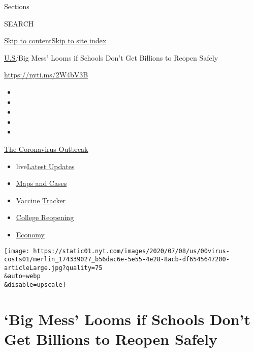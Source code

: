 Sections

SEARCH

\protect\hyperlink{site-content}{Skip to
content}\protect\hyperlink{site-index}{Skip to site index}

\href{/section/us}{U.S.}\textbar{}`Big Mess' Looms if Schools Don't Get
Billions to Reopen Safely

\url{https://nyti.ms/2W4bV3B}

\begin{itemize}
\item
\item
\item
\item
\item
\end{itemize}

\href{https://www.nytimes.com/news-event/coronavirus?action=click\&pgtype=Article\&state=default\&region=TOP_BANNER\&context=storylines_menu}{The
Coronavirus Outbreak}

\begin{itemize}
\tightlist
\item
  live\href{https://www.nytimes.com/2020/08/04/world/coronavirus-cases.html?action=click\&pgtype=Article\&state=default\&region=TOP_BANNER\&context=storylines_menu}{Latest
  Updates}
\item
  \href{https://www.nytimes.com/interactive/2020/us/coronavirus-us-cases.html?action=click\&pgtype=Article\&state=default\&region=TOP_BANNER\&context=storylines_menu}{Maps
  and Cases}
\item
  \href{https://www.nytimes.com/interactive/2020/science/coronavirus-vaccine-tracker.html?action=click\&pgtype=Article\&state=default\&region=TOP_BANNER\&context=storylines_menu}{Vaccine
  Tracker}
\item
  \href{https://www.nytimes.com/2020/08/02/us/covid-college-reopening.html?action=click\&pgtype=Article\&state=default\&region=TOP_BANNER\&context=storylines_menu}{College
  Reopening}
\item
  \href{https://www.nytimes.com/live/2020/08/04/business/stock-market-today-coronavirus?action=click\&pgtype=Article\&state=default\&region=TOP_BANNER\&context=storylines_menu}{Economy}
\end{itemize}

\texttt{[image: https://static01.nyt.com/images/2020/07/08/us/00virus-costs01/merlin\_174339027\_b56dac6e-5e55-4e28-8acb-df6545647200-articleLarge.jpg?quality=75\\\&auto=webp\\\&disable=upscale]}

\hypertarget{big-mess-looms-if-schools-dont-get-billions-to-reopen-safely}{%
\section{`Big Mess' Looms if Schools Don't Get Billions to Reopen
Safely}\label{big-mess-looms-if-schools-dont-get-billions-to-reopen-safely}}

